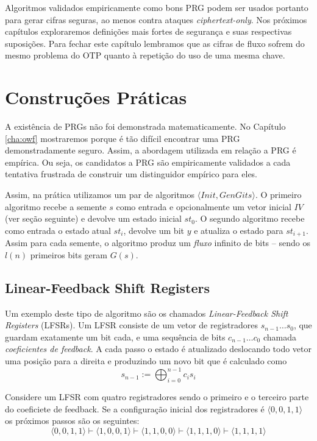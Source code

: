 Algoritmos validados empiricamente como bons PRG podem ser usados portanto para gerar cifras seguras, ao menos contra ataques {\em ciphertext-only}.
Nos próximos capítulos exploraremos definições mais fortes de segurança e suas respectivas suposições.
Para fechar este capítulo lembramos que as cifras de fluxo sofrem do mesmo problema do OTP quanto à repetição do uso de uma mesma chave.

\section{Construções Práticas}
\label{sec:construcoes-praticas}

A existência de PRGs não foi demonstrada matematicamente.
No Capítulo \ref{cha:owf} mostraremos porque é tão difícil encontrar uma PRG demonstradamente seguro.
Assim, a abordagem utilizada em relação a PRG é empírica.
Ou seja, os candidatos a PRG são empiricamente validados a cada tentativa frustrada de construir um distinguidor empírico para eles.

Assim, na prática utilizamos um par de algoritmos $\langle Init, GenGits \rangle$.
O primeiro algoritmo recebe a semente $s$ como entrada e opcionalmente um vetor inicial $IV$ (ver seção seguinte) e devolve um estado inicial $st_0$.
O segundo algoritmo recebe como entrada o estado atual $st_i$, devolve um bit $y$ e atualiza o estado para $st_{i+1}$.
Assim para cada semente, o algoritmo produz um {\em fluxo} infinito de bits -- sendo os $l(n)$ primeiros bits geram $G(s)$.

\subsection{Linear-Feedback Shift Registers}
\label{sec:lfsr}

Um exemplo deste tipo de algoritmo são os chamados {\em Linear-Feedback Shift Registers} (LFSRs).
Um LFSR consiste de um vetor de registradores $s_{n-1} \dots s_0$, que guardam exatamente um bit cada, e uma sequência de bits $c_{n-1} \dots c_0$ chamada {\em coeficientes de feedback}.
A cada passo o estado é atualizado deslocando todo vetor uma posição para a direita e produzindo um novo bit que é calculado como
\begin{displaymath}
s_{n-1} := \bigoplus_{i=0}^{n-1}c_is_i  
\end{displaymath}

\begin{example}
  Considere um LFSR com quatro registradores sendo o primeiro e o terceiro parte do coeficiete de feedback.
Se a configuração inicial dos registradores é $\langle 0,0,1,1 \rangle$ os próximos passos são os seguintes:
\begin{displaymath}
  \langle 0,0,1,1 \rangle \vdash
  \langle 1,0,0,1 \rangle \vdash 
  \langle 1,1,0,0 \rangle \vdash
  \langle 1,1,1,0 \rangle \vdash
  \langle 1,1,1,1 \rangle
\end{displaymath}
\end{example}

